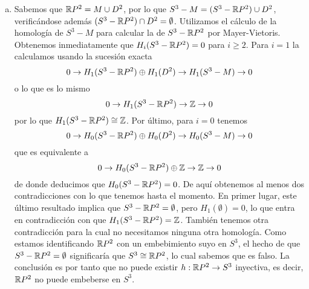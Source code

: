 \documentclass[twoside]{article}
\begin{document}
\begin{solucion}
\begin{enumerate}[(a)]
%

\item Sabemos que $\mathbb{R} P^2 = M\cup D^2$, por lo que $S^3-M=(S^3-\mathbb{R} P^2)\cup D^2$, verificándose además $(S^3-\mathbb{R} P^2)\cap D^2=\emptyset$. Utilizamos el cálculo de la homología de $S^3-M$ para calcular la de $S^3-\mathbb{R} P^2$ por Mayer-Vietoris. Obtenemos inmediatamente que $H_i(S^3-\mathbb{R} P^2)=0$ para $i\geq 2$. Para $i=1$ la calculamos usando la sucesión exacta
\[
0\to H_1(S^3-\mathbb{R} P^2)\oplus H_1(D^2)\to H_1(S^3-M)\to 0
\]
o lo que es lo mismo
\[
0\to H_1(S^3-\mathbb{R} P^2)\to \mathbb{Z}\to 0
\]
por lo que $H_1(S^3-\mathbb{R} P^2)\cong \mathbb{Z}$. Por último, para $i=0$ tenemos
\[
0\to H_0(S^3-\mathbb{R} P^2)\oplus H_0(D^2)\to H_0(S^3-M)\to 0
\]
que es equivalente a 
\[
0\to H_0(S^3-\mathbb{R} P^2)\oplus \mathbb{Z}\to \mathbb{Z}\to 0
\]
de donde deducimos que $H_0(S^3-\mathbb{R} P^2)=0$. De aquí obtenemos al menos dos contradicciones con lo que tenemos hasta el momento. En primer lugar, este último resultado implica que $S^3-\mathbb{R} P^2=\emptyset$, pero $H_1(\emptyset)=0$, lo que entra en contradicción con que $H_1(S^3-\mathbb{R} P^2)=\mathbb{Z}$. También tenemos otra contradicción para la cual no necesitamos ninguna otra homología. Como estamos identificando $\mathbb{R} P^2$ con un embebimiento suyo en $S^3$, el hecho de que $S^3-\mathbb{R} P^2=\emptyset$ significaría que $S^3\cong \mathbb{R} P^2$, lo cual sabemos que es falso. La conclusión es por tanto que no puede existir $h:\mathbb{R} P^2\to S^3$ inyectiva, es decir, $\mathbb{R} P^2$ no puede embeberse en $S^3$. 
%
\end{enumerate}


\end{solucion}
\end{document}
